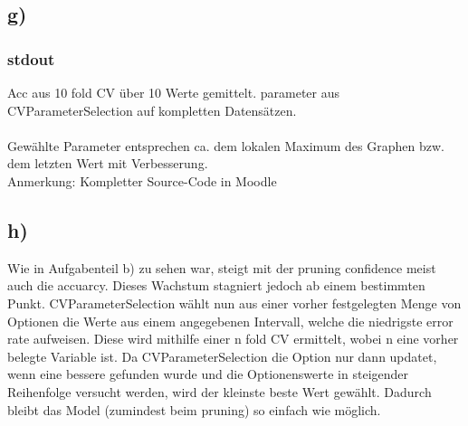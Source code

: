 \documentclass[a4paper,11pt,twoside]{article}
\begin{document}
\subsection*{g)}




\subsubsection*{stdout}
Acc aus 10 fold CV über 10 Werte gemittelt. parameter aus CVParameterSelection auf kompletten Datensätzen.\\
\\
Gewählte Parameter entsprechen ca. dem lokalen Maximum des Graphen bzw. dem letzten Wert mit Verbesserung.\\
Anmerkung: Kompletter Source-Code in Moodle
\subsection*{h)}
Wie in Aufgabenteil b) zu sehen war, steigt mit der pruning confidence meist auch die accuarcy. Dieses Wachstum stagniert jedoch ab einem bestimmten Punkt. CVParameterSelection wählt nun aus einer vorher festgelegten Menge von Optionen die Werte aus einem angegebenen Intervall, welche die niedrigste error rate aufweisen. Diese wird mithilfe einer n fold CV ermittelt, wobei n eine vorher belegte Variable ist. Da CVParameterSelection die Option nur dann updatet, wenn eine bessere gefunden wurde und die Optionenswerte in steigender Reihenfolge versucht werden, wird der kleinste beste Wert gewählt. Dadurch bleibt das Model (zumindest beim pruning) so einfach wie möglich.
\end{document}
